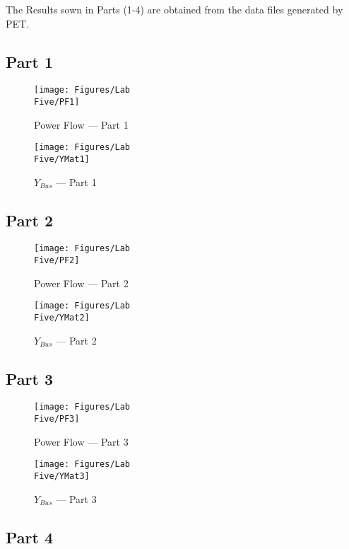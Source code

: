 \documentclass[
	letterpaper, %
	10pt, %
]{CSUniSchoolLabReport}
\begin{document}
The Results sown in Parts (1-4) are obtained from the data files generated by PET.

\subsection{Part 1}

\begin{figure}[H]
  \centering
  \texttt{[image: Figures/Lab\\ Five/PF1]}
  \caption{Power Flow — Part 1}
  \label{fig:2}
\end{figure}

\begin{figure}[H]
  \centering
  \texttt{[image: Figures/Lab\\ Five/YMat1]}
  \caption{$Y_{Bus}$ — Part 1}
  \label{fig:3}
\end{figure}

\subsection{Part 2}

\begin{figure}[H]
  \centering
  \texttt{[image: Figures/Lab\\ Five/PF2]}
  \caption{Power Flow — Part 2}
  \label{fig:4}
\end{figure}

\begin{figure}[H]
  \centering
  \texttt{[image: Figures/Lab\\ Five/YMat2]}
  \caption{$Y_{Bus}$ — Part 2}
  \label{fig:5}
\end{figure}

\subsection{Part 3}

\begin{figure}[H]
  \centering
  \texttt{[image: Figures/Lab\\ Five/PF3]}
  \caption{Power Flow — Part 3}
  \label{fig:6}
\end{figure}

\begin{figure}[H]
  \centering
  \texttt{[image: Figures/Lab\\ Five/YMat3]}
  \caption{$Y_{Bus}$ — Part 3}
  \label{fig:7}
\end{figure}

\subsection{Part 4}
\end{document}

